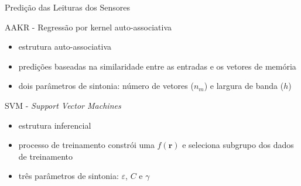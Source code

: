 \documentclass{beamer}
\begin{document}
\begin{frame}{Predição das Leituras dos Sensores}

    \begin{block}{AAKR - Regressão por kernel auto-associativa}
        \begin{itemize}
            \item estrutura auto-associativa
            \item predições baseadas na similaridade entre as entradas e os vetores de
                memória
            \item dois parâmetros de sintonia: número de vetores ($n_m$) e largura de
                banda ($h$)
        \end{itemize}
    \end{block}

    \begin{block}{SVM - \textit{Support Vector Machines}}
        \begin{itemize}
            \item estrutura inferencial
            \item processo de treinamento constrói uma $f(\mathbf{r})$ e seleciona
                subgrupo dos dados de treinamento
            \item três parâmetros de sintonia: $\varepsilon$, $C$ e $\gamma$
        \end{itemize}
        
    \end{block}

    
\end{frame}
\end{document}

